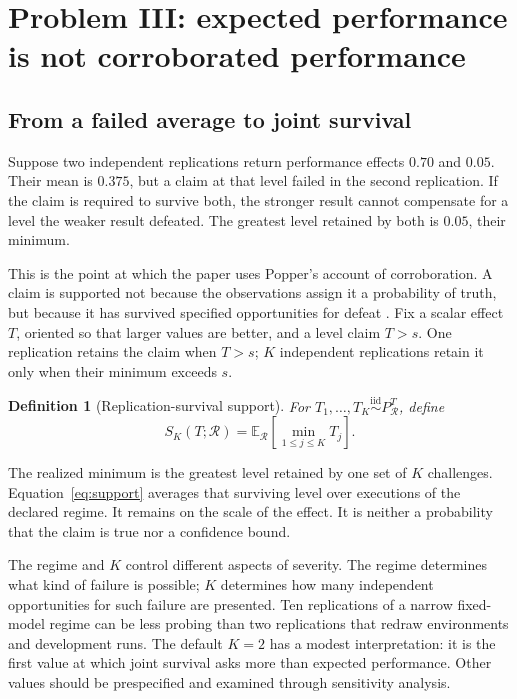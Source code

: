 \documentclass[11pt]{article}
\newcommand{\Regime}{\mathcal{R}}
\newcommand{\E}{\mathbb{E}}
\newcommand{\iid}{\mathrel{\overset{\mathrm{iid}}{\sim}}}
\newtheorem{definition}{Definition}
\theoremstyle{remark}
\begin{document}
\section{Problem III: expected performance is not corroborated performance}
\label{sec:support}

\subsection{From a failed average to joint survival}

Suppose two independent replications return performance effects $0.70$ and $0.05$. Their mean is $0.375$, but a claim at that level failed in the second replication. If the claim is required to survive both, the stronger result cannot compensate for a level the weaker result defeated. The greatest level retained by both is $0.05$, their minimum.

This is the point at which the paper uses Popper's account of corroboration. A claim is supported not because the observations assign it a probability of truth, but because it has survived specified opportunities for defeat \cite{popper1959logic,popper1963conjectures}. Fix a scalar effect $T$, oriented so that larger values are better, and a level claim $T>s$. One replication retains the claim when $T>s$; $K$ independent replications retain it only when their minimum exceeds $s$.

\begin{definition}[Replication-survival support]
For $T_1,\ldots,T_K\iid P_{\Regime}^{T}$, define
\begin{equation}
S_K(T;\Regime)
=
\E_{\Regime}\left[
\min_{1\leq j\leq K}T_j
\right].
\label{eq:support}
\end{equation}
\end{definition}

The realized minimum is the greatest level retained by one set of $K$ challenges. Equation~\eqref{eq:support} averages that surviving level over executions of the declared regime. It remains on the scale of the effect. It is neither a probability that the claim is true nor a confidence bound.

The regime and $K$ control different aspects of severity. The regime determines what kind of failure is possible; $K$ determines how many independent opportunities for such failure are presented. Ten replications of a narrow fixed-model regime can be less probing than two replications that redraw environments and development runs. The default $K=2$ has a modest interpretation: it is the first value at which joint survival asks more than expected performance. Other values should be prespecified and examined through sensitivity analysis.
\end{document}
